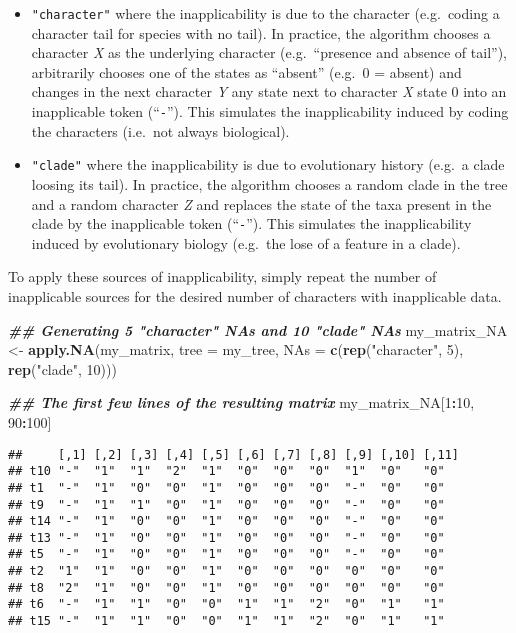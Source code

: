 \documentclass[
]{book}
\newenvironment{Shaded}{\begin{snugshade}}{\end{snugshade}}
\newcommand{\AttributeTok}[1]{\textcolor[rgb]{0.13,0.29,0.53}{#1}}
\newcommand{\DecValTok}[1]{\textcolor[rgb]{0.00,0.00,0.81}{#1}}
\newcommand{\DocumentationTok}[1]{\textcolor[rgb]{0.56,0.35,0.01}{\textbf{\textit{#1}}}}
\newcommand{\FunctionTok}[1]{\textcolor[rgb]{0.13,0.29,0.53}{\textbf{#1}}}
\newcommand{\NormalTok}[1]{#1}
\newcommand{\OtherTok}[1]{\textcolor[rgb]{0.56,0.35,0.01}{#1}}
\newcommand{\SpecialCharTok}[1]{\textcolor[rgb]{0.81,0.36,0.00}{\textbf{#1}}}
\newcommand{\StringTok}[1]{\textcolor[rgb]{0.31,0.60,0.02}{#1}}
\providecommand{\tightlist}{%
  \setlength{\itemsep}{0pt}\setlength{\parskip}{0pt}}
\begin{document}
\begin{itemize}
\tightlist
\item
  \texttt{"character"} where the inapplicability is due to the character (e.g.~coding a character tail for species with no tail).
  In practice, the algorithm chooses a character \emph{X} as the underlying character (e.g.~``presence and absence of tail''), arbitrarily chooses one of the states as ``absent'' (e.g.~0 = absent) and changes in the next character \emph{Y} any state next to character \emph{X} state 0 into an inapplicable token (``\texttt{-}'').
  This simulates the inapplicability induced by coding the characters (i.e.~not always biological).
\item
  \texttt{"clade"} where the inapplicability is due to evolutionary history (e.g.~a clade loosing its tail).
  In practice, the algorithm chooses a random clade in the tree and a random character \emph{Z} and replaces the state of the taxa present in the clade by the inapplicable token (``\texttt{-}'').
  This simulates the inapplicability induced by evolutionary biology (e.g.~the lose of a feature in a clade).
\end{itemize}

To apply these sources of inapplicability, simply repeat the number of inapplicable sources for the desired number of characters with inapplicable data.

\begin{Shaded}
\begin{Highlighting}[]
\DocumentationTok{\#\# Generating 5 "character" NAs and 10 "clade" NAs}
\NormalTok{my\_matrix\_NA }\OtherTok{\textless{}{-}} \FunctionTok{apply.NA}\NormalTok{(my\_matrix, }\AttributeTok{tree =}\NormalTok{ my\_tree,}
                         \AttributeTok{NAs =} \FunctionTok{c}\NormalTok{(}\FunctionTok{rep}\NormalTok{(}\StringTok{"character"}\NormalTok{, }\DecValTok{5}\NormalTok{),}
                                 \FunctionTok{rep}\NormalTok{(}\StringTok{"clade"}\NormalTok{, }\DecValTok{10}\NormalTok{)))}

\DocumentationTok{\#\# The first few lines of the resulting matrix}
\NormalTok{my\_matrix\_NA[}\DecValTok{1}\SpecialCharTok{:}\DecValTok{10}\NormalTok{, }\DecValTok{90}\SpecialCharTok{:}\DecValTok{100}\NormalTok{]}
\end{Highlighting}
\end{Shaded}

\begin{verbatim}
##     [,1] [,2] [,3] [,4] [,5] [,6] [,7] [,8] [,9] [,10] [,11]
## t10 "-"  "1"  "1"  "2"  "1"  "0"  "0"  "0"  "1"  "0"   "0"  
## t1  "-"  "1"  "0"  "0"  "1"  "0"  "0"  "0"  "-"  "0"   "0"  
## t9  "-"  "1"  "1"  "0"  "1"  "0"  "0"  "0"  "-"  "0"   "0"  
## t14 "-"  "1"  "0"  "0"  "1"  "0"  "0"  "0"  "-"  "0"   "0"  
## t13 "-"  "1"  "0"  "0"  "1"  "0"  "0"  "0"  "-"  "0"   "0"  
## t5  "-"  "1"  "0"  "0"  "1"  "0"  "0"  "0"  "-"  "0"   "0"  
## t2  "1"  "1"  "0"  "0"  "1"  "0"  "0"  "0"  "0"  "0"   "0"  
## t8  "2"  "1"  "0"  "0"  "1"  "0"  "0"  "0"  "0"  "0"   "0"  
## t6  "-"  "1"  "1"  "0"  "0"  "1"  "1"  "2"  "0"  "1"   "1"  
## t15 "-"  "1"  "1"  "0"  "0"  "1"  "1"  "2"  "0"  "1"   "1"
\end{verbatim}
\end{document}
